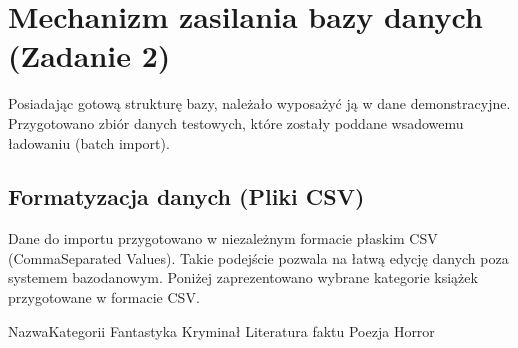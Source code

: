 \documentclass[a4paper,11pt,english,openany,oneside]{sphinxmanual}
\begin{document}
\begin{sphinxVerbatim}[commandchars=\\\{\}]
\end{sphinxVerbatim}


\section{Mechanizm zasilania bazy danych (Zadanie 2)}
\label{\detokenize{rozdzial_4/index:mechanizm-zasilania-bazy-danych-zadanie-2}}
\sphinxAtStartPar
Posiadając gotową strukturę bazy, należało wyposażyć ją w dane demonstracyjne. Przygotowano zbiór danych testowych, które zostały poddane wsadowemu ładowaniu (batch import).


\subsection{Formatyzacja danych (Pliki CSV)}
\label{\detokenize{rozdzial_4/index:formatyzacja-danych-pliki-csv}}
\sphinxAtStartPar
Dane do importu przygotowano w niezależnym formacie płaskim CSV (Comma\sphinxhyphen{}Separated Values). Takie podejście pozwala na łatwą edycję danych poza systemem bazodanowym. Poniżej zaprezentowano wybrane kategorie książek przygotowane w formacie CSV.

\begin{sphinxVerbatim}[commandchars=\\\{\}]
Nazwa\PYGZus{}Kategorii
Fantastyka
Kryminał
Literatura faktu
Poezja
Horror
\end{sphinxVerbatim}
\end{document}
